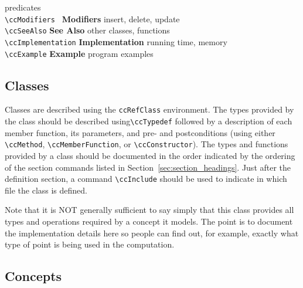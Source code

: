 \begin{tabbing}
                                                     predicates\\
  \> \verb+\ccModifiers +      \>  {\bf Modifiers}    \>
                                                     insert, delete, update\\
  \> \verb+\ccSeeAlso+         \>  {\bf See Also}\>
                                                     other classes, functions\\
  \> \verb+\ccImplementation+  \>  {\bf Implementation}\>
                                                     running time, memory\\
  \> \verb+\ccExample+         \>  {\bf Example}       \>
                                                     program examples
\end{tabbing}


\subsection{Classes}
\label{sec:ref_class}

Classes are described using the {\tt ccRefClass} environment.
The types provided by the class should be described using\verb|\ccTypedef|
followed by a description
of each member function, its parameters, and pre- and postconditions (using 
either \verb|\ccMethod|, \verb|\ccMemberFunction|, or \verb|\ccConstructor|).
The types and functions provided by a class should be documented in the
order indicated by the ordering of the section commands listed in
Section~\ref{sec:section_headings}.
Just after the definition section, a command \verb|\ccInclude| should be
used to indicate in which file the class is defined.

Note that it is NOT generally sufficient to say simply that this class
provides all types and operations required by a concept it models.  The
point is to document the implementation details here so people can find
out, for example, exactly what type of point is being used in the computation.

\subsection{Concepts}
\label{sec:ref_concept}

